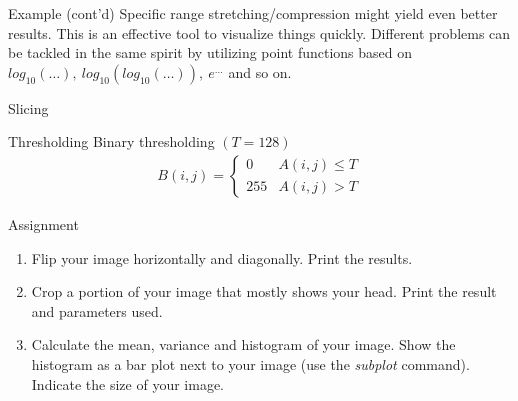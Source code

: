 %
%
\begin{slide}{Example (cont'd)}
\centering
\scriptsize
Specific range stretching/compression might yield even better
results.
This is an effective tool to visualize things quickly.
Different problems can be tackled in the same spirit
by utilizing point functions based on $log_{10}(\ldots),\
log_{10}(log_{10}(\ldots)),\ e^{\ldots}$ and so on.
\end{slide}


%
%
\begin{slide}{Slicing}
\vspace*{-12pt}
\end{slide}


%
%
\begin{slide}{Thresholding}
Binary thresholding $(T=128)$
\begin{eqnarray*}
B(i,j)=\left\{\begin{array}{ll}
0& A(i,j)\leq T \\
255& A(i,j)>T
\end{array}\right.
\end{eqnarray*}
\end{slide}


%
%
\begin{frame}{Assignment} %
\begin{enumerate}
\item Flip your image horizontally and diagonally.
Print the results.
\item Crop a portion of your image that mostly shows
your head.
Print the result and parameters used.
\item Calculate the mean, variance and histogram of your image.
Show the histogram as a bar plot next to your image
(use the {\em subplot} command).
Indicate the size of your image.

\end{enumerate}
\end{frame}
